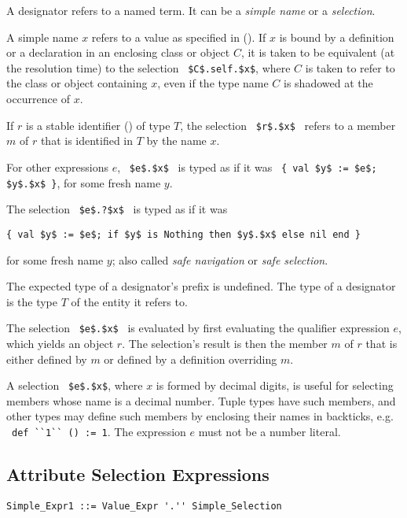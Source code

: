 A designator refers to a named term. It can be a {\em simple name} or a {\em selection}.

A simple name $x$ refers to a value as specified in (). If $x$ is bound by a definition or a declaration in an enclosing class or object $C$, it is taken to be equivalent (at the resolution time) to the selection ~\lstinline!$C$.self.$x$!, where $C$ is taken to refer to the class or object containing $x$, even if the type name $C$ is shadowed at the occurrence of $x$. 

If $r$ is a stable identifier () of type $T$, the selection ~\lstinline!$r$.$x$!~ refers to a member $m$ of $r$ that is identified in $T$ by the name $x$. 

For other expressions $e$, ~\lstinline!$e$.$x$!~ is typed as if it was ~\lstinline!{ val $y$ := $e$; $y$.$x$ }!, for some fresh name $y$. 

The selection ~\lstinline!$e$.?$x$!~ is typed as if it was 
\begin{lstlisting}
{ val $y$ := $e$; if $y$ is Nothing then $y$.$x$ else nil end }
\end{lstlisting}
for some fresh name $y$; also called {\em safe navigation} or {\em safe selection}.

The expected type of a designator's prefix is undefined. The type of a designator is the type $T$ of the entity it refers to. 

The selection ~\lstinline!$e$.$x$!~ is evaluated by first evaluating the qualifier expression $e$, which yields an object $r$. The selection's result is then the member $m$ of $r$ that is either defined by $m$ or defined by a definition overriding $m$. 

A selection ~\lstinline!$e$.$x$!, where $x$ is formed by decimal digits, is useful for selecting members whose name is a decimal number. Tuple types have such members, and other types may define such members by enclosing their names in backticks, e.g. ~\lstinline!def ``1`` () := 1!. The expression $e$ must not be a number literal. 





\subsection{Attribute Selection Expressions}
\label{sec:attribute-selection}

\syntax\begin{lstlisting}
Simple_Expr1 ::= Value_Expr '.'' Simple_Selection
\end{lstlisting}

